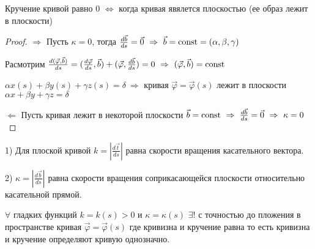\begin{theorem}
  Кручение кривой равно $0$ $\Leftrightarrow$ когда кривая явялется плоскостью
  (ее образ лежит в плоскости)
\end{theorem}

\begin{proof}
  $\Rightarrow$ Пусть $\kappa = 0$, тогда $\frac{d\vec b}{ds} = \vec 0 ~
  \Rightarrow ~ \vec b = \mathrm{const} = (\alpha, \beta, \gamma)$

  Расмотрим
  $\frac{d(\vec \varphi, \vec b)}{ds} = (\frac{d \vec \varphi}{ds}, \vec b) +
  (\vec \varphi, \frac{d\vec b}{ds}) = 0 ~ \Rightarrow ~
  (\vec \varphi, \vec b) = \mathrm{const}$

  $\alpha x(s) + \beta y(s) + \gamma z(s) = \delta ~ \Rightarrow$ кривая
  $\vec \varphi = \vec \varphi (s)$ лежит в плоскости $\alpha x + \beta y +
  \gamma z = \delta$

  $\Leftarrow$ Пусть кривая лежит в некоторой плоскости
  $\vec b = \mathrm{const} ~ \Rightarrow ~ \frac{d \vec b}{ds} = \vec 0 ~ \Rightarrow ~
  \kappa = 0$
\end{proof}

\begin{block}
  1) Для плоской кривой $k = \left|\frac{d \vec t}{ds}\right|$ равна
  скорости вращения касательного вектора.

  2) $\kappa = \left|\frac{d\vec b}{ds}\right|$ равна скорости вращения
  соприкасающейся плоскости относительно касательной прямой.
\end{block}

\begin{theorem}
  $\forall$ гладких функций $k = k(s) > 0$ и $\kappa = \kappa(s)$ $\exists!$
  с точностью до пложения в пространстве кривая
  $\vec \varphi = \vec \varphi(s)$ где кривизна и кручение равна то есть
  кривизна и кручение определяют кривую однозначно.
\end{theorem}